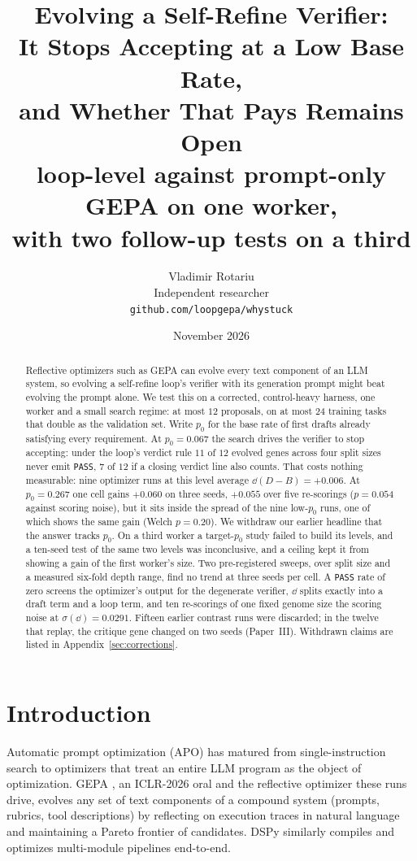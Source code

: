 \documentclass[11pt]{article}
\title{Evolving a Self-Refine Verifier:\\
It Stops Accepting at a Low Base Rate,\\
and Whether That Pays Remains Open\\
\large loop-level against prompt-only GEPA on one worker,\\
with two follow-up tests on a third}
\author{Vladimir Rotariu \\ Independent researcher \\
  \texttt{github.com/loopgepa/whystuck}}
\date{November 2026}
\begin{document}
\maketitle

\begin{abstract}
Reflective optimizers such as GEPA \citep{agrawal2025gepa} can evolve every text component of an
LLM system, so evolving a self-refine loop's verifier with its generation prompt might beat
evolving the prompt alone. We test this on a corrected, control-heavy harness, one worker and a
small search regime: at most $12$ proposals, on at most $24$ training tasks that double as the
validation set. Write $p_0$ for the base rate of first drafts already satisfying every
requirement. At $p_0 = 0.067$ the search drives the verifier to stop accepting: under the loop's
verdict rule $11$ of $12$ evolved genes across four split sizes never emit \texttt{PASS}, $7$ of
$12$ if a closing verdict line also counts. That costs nothing measurable: nine optimizer runs at
this level average $\dd(D-B) = +0.006$. At $p_0 = 0.267$ one cell gains $+0.060$ on three seeds,
$+0.055$ over five re-scorings ($p = 0.054$ against scoring noise), but it sits inside the spread
of the nine low-$p_0$ runs, one of which shows the same gain (Welch $p = 0.20$). We withdraw our
earlier headline that the answer tracks $p_0$. On a third worker a target-$p_0$ study failed to
build its levels, and a ten-seed test of the same two levels was inconclusive, and a ceiling
kept it from showing a gain of the first worker's size. Two pre-registered sweeps, over split
size and a measured six-fold depth range, find no trend at three seeds per cell. A \texttt{PASS}
rate of zero screens the optimizer's output for the degenerate verifier, $\dd$ splits exactly
into a draft term and a loop term, and ten re-scorings of one fixed genome size the scoring noise
at $\sigma(\dd) = 0.0291$. Fifteen earlier contrast runs were discarded; in the twelve that
replay, the critique gene changed on two seeds (Paper~III). Withdrawn claims are listed in
Appendix~\ref{sec:corrections}.
\end{abstract}



\section{Introduction}
\label{sec:intro}

Automatic prompt optimization (APO) has matured from single-instruction search
\citep{yang2023opro} to optimizers that treat an entire LLM program as
the object of optimization. GEPA \citep{agrawal2025gepa}, an ICLR-2026 oral and
the reflective optimizer these runs drive, evolves any set of
text components of a compound system (prompts, rubrics, tool descriptions)
by reflecting on execution traces in natural language and maintaining a Pareto
frontier of candidates. DSPy \citep{khattab2023dspy} similarly compiles and
optimizes multi-module pipelines end-to-end.
\end{document}
